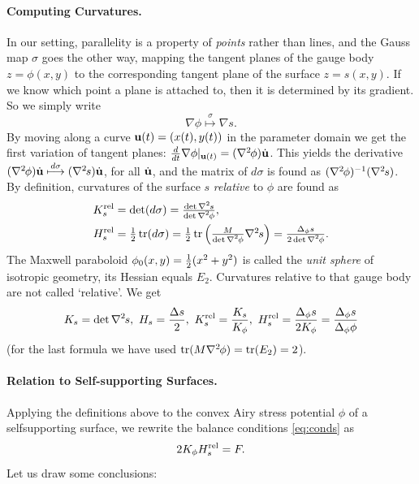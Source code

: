 \documentclass[annual]{acmsiggraph}
\def\tr{\mathop{\textrm{tr}}\nolimits}
\def\rel{{\mathord{\text{\rm rel}}}}
\def\ess{s}
\def\Hess#1{{\def\testess{#1}\nabla^2\ifx\testess\ess\!s\else #1\fi}}
\def\Hess#1{\text{$\nabla^2\hskip-.2ex #1$}}
\begin{document}
\paragraph{Computing Curvatures.}

In our setting, parallelity is a property of {\em points} rather than 
lines, and the Gauss map $\sigma$ goes the other way, mapping the tangent 
planes of the gauge body $z=\phi(x,y)$ to the corresponding tangent plane 
of the surface $z=s(x,y)$. If we know which point a plane is attached to, 
then it is determined by its gradient. So we simply write
	$$\nabla \phi\overset\sigma\longmapsto\nabla s.
	$$
 By moving along a curve ${\mathbf u}(t)=(x(t),y(t))$ in the parameter domain we 
get the first variation of tangent planes:
	$
	{d\over dt}\nabla \phi|_{\uw(t)} = 
	(\Hess\phi)\dot\uw
	$.
 This yields the derivative
	$	
	(\Hess\phi)\dot\uw \overset{d\sigma}\longmapsto
	(\Hess s)\dot\uw $,
 for all $\dot{{\mathbf u}}$, and the matrix of $d\sigma$ is found as 
$(\Hess\phi)^{-1}(\Hess s)$.  By definition, curvatures of the surface $s$ 
{\em relative} to $\phi$ are found as
	\begin{align*}
		K_s^\rel 
	& = \textstyle
		\det(d\sigma) =
		{\det\Hess s \over \det\Hess\phi} ,
	\\
		H_s^\rel
	&= \textstyle
		{1\over 2}\tr(d\sigma) 
		= {1\over 2}\tr \left({M\over\det\Hess\phi} \Hess s\right)
		=  {\Delta_\phi s \over 2\det\Hess\phi}.
	\end{align*}
 The Maxwell paraboloid $\phi_0(x,y)={1\over 2}(x^2+y^2)$ is called the 
{\em unit sphere} of isotropic geometry, its Hessian equals $E_2$. 
Curvatures relative to that gauge body are not called `relative'. We get
	\begin{align*}
	K_s = \det \Hess s, 
		\ 
	H_s = {\Delta s \over 2},
		\
	K_s^\rel = {K_s\over K_\phi},
		\
	H_s^\rel =  {\Delta_\phi s \over 2 K_\phi}
			= {\Delta_\phi s\over \Delta_\phi \phi}
	\end{align*}
 (for the last formula we have used $\tr (M\Hess\phi)=\tr(E_2)=2$).

\paragraph{Relation to Self-supporting Surfaces.}

Applying the definitions above to the convex Airy stress potential $\phi$ 
of a self\dash supporting surface, we rewrite the balance conditions 
\eqref{eq:conds} as
	\begin{equation}
	2 K_\phi H_s^\rel  = F.
	\label{equigeo}
	\end{equation}
 Let us draw some conclusions:
\end{document}
